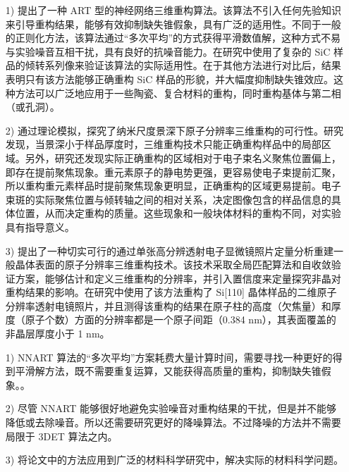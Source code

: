 \setlength{\baselineskip}{30pt}
\noindent {}

\song\setlength{\baselineskip}{20pt}

\begin{enumerate}
	\item[1)] 
	提出了一种 ART 型的神经网络三维重构算法。该算法不引入任何先验知识来引导重构结果，能够有效抑制缺失锥假象，具有广泛的适用性。不同于一般的正则化方法，该算法通过“多次平均”的方式获得平滑数值解，这种方式不易与实验噪音互相干扰，具有良好的抗噪音能力。在研究中使用了复杂的 SiC 样品的倾转系列像来验证该算法的实际适用性。在于其他方法进行对比后，结果表明只有该方法能够正确重构 SiC 样品的形貌，并大幅度抑制缺失锥效应。这种方法可以广泛地应用于一些陶瓷、复合材料的重构，同时重构基体与第二相（或孔洞）。
	\item[2)]
	通过理论模拟，探究了纳米尺度景深下原子分辨率三维重构的可行性。研究发现，当景深小于样品厚度时，三维重构技术只能正确重构样品中的局部区域。另外，研究还发现实际正确重构的区域相对于电子束名义聚焦位置偏上，即存在提前聚焦现象。重元素原子的静电势更强，更容易使电子束提前汇聚，所以重构重元素样品时提前聚焦现象更明显，正确重构的区域更易提前。电子束斑的实际聚焦位置与倾转轴之间的相对关系，决定图像包含的样品信息的具体位置，从而决定重构的质量。这些现象和一般块体材料的重构不同，对实验具有指导意义。
	\item[3)] 
	提出了一种切实可行的通过单张高分辨透射电子显微镜照片定量分析重建一般晶体表面的原子分辨率三维重构技术。该技术采取全局匹配算法和自收敛验证方案，能够估计和定义三维重构的分辨率，并引入置信度来定量探究非晶对重构结果的影响。在研究中使用了该方法重构了 Si[110] 晶体样品的二维原子分辨率透射电镜照片，并且测得该重构的结果在原子柱的高度（欠焦量）和厚度（原子个数）方面的分辨率都是一个原子间距（0.384 nm），其表面覆盖的非晶层厚度小于 1 nm。
\end{enumerate}


\setlength{\baselineskip}{30pt}
\noindent {}

\song\setlength{\baselineskip}{20pt}

\begin{enumerate}
	\item[1)] 
	NNART 算法的“多次平均”方案耗费大量计算时间，需要寻找一种更好的得到平滑解方法，既不需要重复运算，又能获得高质量的重构，抑制缺失锥假象。。
	\item[2)]
	尽管 NNART 能够很好地避免实验噪音对重构结果的干扰，但是并不能够降低或去除噪音。所以还需要研究更好的降噪算法。不过降噪的方法并不需要局限于 3DET 算法之内。
	\item[3)] 
	将论文中的方法应用到广泛的材料科学研究中，解决实际的材料科学问题。
\end{enumerate}	



\clearemptydoublepage